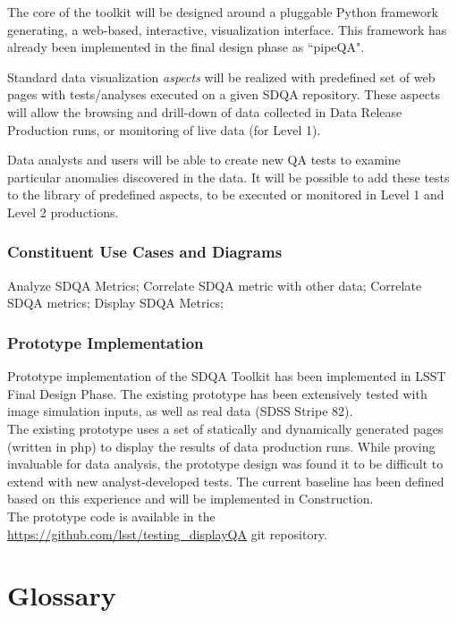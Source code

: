 \documentclass[12pt]{article}
\begin{document}
The core of the toolkit will be designed around a pluggable Python framework generating, a web-based, interactive, visualization interface. This framework has already been implemented in the final design phase as ``pipeQA".

Standard data visualization \emph{aspects} will be realized with predefined set of web pages with tests/analyses executed on a given SDQA repository. These aspects will allow the browsing and drill-down of data collected in Data Release Production runs, or monitoring of live data (for Level 1).

Data analysts and users will be able to create new QA tests to examine particular anomalies discovered in the data. It will be possible to add these tests to the library of predefined aspects, to be executed or monitored in Level 1 and Level 2 productions.

\subsubsection{Constituent Use Cases and Diagrams}

Analyze SDQA Metrics; Correlate SDQA metric with other data; Correlate SDQA metrics; Display SDQA Metrics;

\subsubsection{Prototype Implementation}

Prototype implementation of the SDQA Toolkit has been implemented in LSST Final Design Phase. The existing prototype has been extensively tested with image simulation inputs, as well as real data (SDSS Stripe 82).
\\

The existing prototype uses a set of statically and dynamically generated pages (written in php) to display the results of data production runs. While proving invaluable for data analysis, the prototype design was found it to be difficult to extend with new analyst-developed tests. The current baseline has been defined based on this experience and will be implemented in Construction.
\\

The prototype code is available in the \url{https://github.com/lsst/testing_displayQA} git repository.

\clearpage

\section{Glossary}
\end{document}
